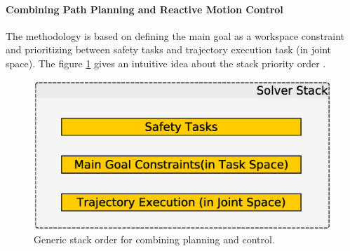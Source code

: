 

\paragraph{Combining Path Planning and Reactive Motion Control}
The methodology is based on defining the main goal as a workspace constraint and prioritizing between safety tasks and trajectory execution task (in joint space). The figure \ref{gso} gives an intuitive idea about the stack priority order .
   \begin{figure}[thpb]
      \centering
      \includegraphics[scale=0.5]{chapters/doa/images/ProposedMethodology.eps}
      \caption{Generic stack order for combining planning and control. }
      \label{gso}
   \end{figure}

